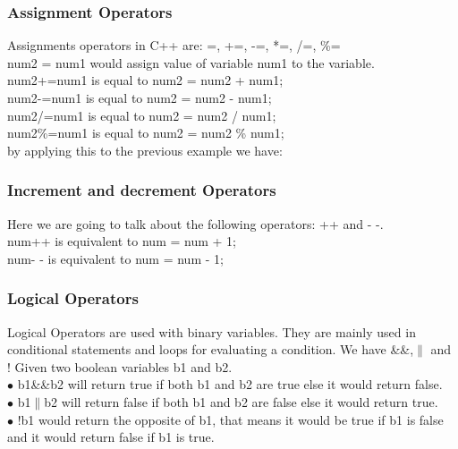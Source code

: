 \documentclass[11pt, a4paper]{article}
\begin{document}
\subsubsection{Assignment Operators}
Assignments operators in C++ are: =, +=, -=, *=, /=, \%= \\
num2 = num1 would assign value of variable num1 to the variable.\\
num2+=num1 is equal to num2 = num2 + num1;\\
num2-=num1 is equal to num2 = num2 - num1;\\
num2/=num1 is equal to num2 = num2 / num1;\\
num2\%=num1 is equal to num2 = num2 \% num1;\\
\newline by applying this to the previous example we have:


\subsubsection{Increment and decrement Operators}
Here we are going to talk about the following operators: ++ and - -.\\
num++ is equivalent to num = num + 1;\\
num- - is equivalent to num = num - 1;


\subsubsection{Logical Operators}
Logical Operators are used with binary variables. They are mainly used in
conditional statements and loops for evaluating a condition. We have \&\&,$\|$ and !
Given two boolean variables b1 and b2.\\
$\bullet$ b1\&\&b2 will return true if both b1 and b2 are true else it would return false.\\
$\bullet$ b1$\|$b2 will return false if both b1 and b2 are false else it would return true.\\
$\bullet$ !b1 would return the opposite of b1, that means it would be true if b1 is false and
it would return false if b1 is true.

\end{document}
